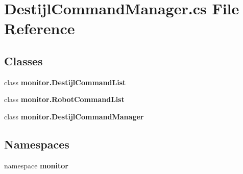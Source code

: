 \section{Destijl\+Command\+Manager.\+cs File Reference}
\label{_destijl_command_manager_8cs}
\subsection*{Classes}
\begin{DoxyCompactItemize}
\item 
class \textbf{ monitor.\+Destijl\+Command\+List}
\item 
class \textbf{ monitor.\+Robot\+Command\+List}
\item 
class \textbf{ monitor.\+Destijl\+Command\+Manager}
\end{DoxyCompactItemize}
\subsection*{Namespaces}
\begin{DoxyCompactItemize}
\item 
namespace \textbf{ monitor}
\end{DoxyCompactItemize}
